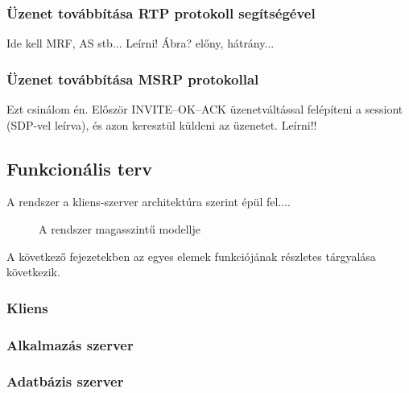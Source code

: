 \subsubsection{Üzenet továbbítása RTP protokoll segítségével}
Ide kell MRF, AS stb... Leírni! Ábra? előny, hátrány...

\subsubsection{Üzenet továbbítása MSRP protokollal}
Ezt csinálom én. Először INVITE--OK--ACK üzenetváltással felépíteni a sessiont (SDP-vel leírva), és azon keresztül küldeni az üzenetet. Leírni!!


\subsection{Funkcionális terv}

A rendszer a kliens-szerver architektúra szerint épül fel....

\begin{figure}[htbp]
\center
{}
\caption{A rendszer magasszintű modellje}
\label{fig:model}
\end{figure}

A következő fejezetekben az egyes elemek funkciójának részletes tárgyalása
következik.

\subsubsection{Kliens}
\label{sec:kliens_pc}


\subsubsection{Alkalmazás szerver}


\subsubsection{Adatbázis szerver}
\label{sec:adatbszerver}

